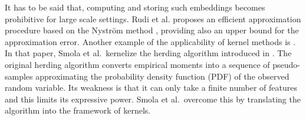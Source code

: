 It has to be said that, computing and storing such embeddings becomes prohibitive for large scale settings. Rudi et al. \cite{2022nystrom} proposes an efficient approximation procedure based on the Nyström method \cite{nystrom}, providing also an upper bound for the approximation error.
Another example of the applicability of kernel methods is \cite{supersamples}. In that paper, Smola et al.\ kernelize the herding algorithm introduced in \cite{welling2009herding,welling2009herding,Welling2010}. The original herding algorithm converts empirical moments into a sequence of pseudo-samples approximating the probability density function (PDF) of the observed random variable. Its weakness is that it can only take a finite number of features and this limits its expressive power.
Smola et al.\ overcome this by translating the algorithm into the framework of kernels.


